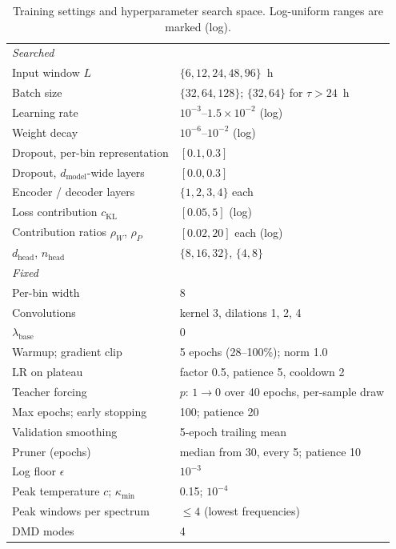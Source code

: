 \begin{table}[t]
\centering
\caption{Training settings and hyperparameter search space. Log-uniform ranges are marked (log).}
\label{tab:hyper}
\small
\begin{tabular}{ll}
\toprule
\multicolumn{2}{l}{\emph{Searched}} \\
Input window $L$ & $\{6,12, 24, 48, 96\}$~h \\
Batch size & $\{32, 64, 128\}$; $\{32, 64\}$ for $\tau > 24$~h \\
Learning rate & $10^{-3}$--$1.5\times10^{-2}$ (log) \\
Weight decay & $10^{-6}$--$10^{-2}$ (log) \\
Dropout, per-bin representation & $[0.1, 0.3]$ \\
Dropout, $d_{\text{model}}$-wide layers & $[0.0, 0.3]$ \\
Encoder / decoder layers & $\{1,2,3,4\}$ each \\
Loss contribution $c_{\text{KL}}$ & $[0.05, 5]$ (log) \\
Contribution ratios $\rho_W$, $\rho_P$ & $[0.02, 20]$ each (log) \\
$d_{\text{head}}$, $n_{\text{head}}$ & $\{8, 16, 32\}$, $\{4, 8\}$ \\
\midrule
\multicolumn{2}{l}{\emph{Fixed}} \\
Per-bin width & 8 \\
Convolutions & kernel 3, dilations 1, 2, 4 \\
$\lambda_{\text{base}}$ & 0 \\
Warmup; gradient clip & 5 epochs (28--100\%); norm 1.0 \\
LR on plateau & factor 0.5, patience 5, cooldown 2 \\
Teacher forcing & $p$: $1 \to 0$ over 40 epochs, per-sample draw \\
Max epochs; early stopping & 100; patience 20 \\
Validation smoothing & 5-epoch trailing mean \\
Pruner (epochs) & median from 30, every 5; patience 10 \\
Log floor $\epsilon$ & $10^{-3}$ \\
Peak temperature $c$; $\kappa_{\min}$ & 0.15; $10^{-4}$ \\
Peak windows per spectrum & $\leq 4$ (lowest frequencies) \\
DMD modes & 4 \\
\bottomrule
\end{tabular}
\end{table}

